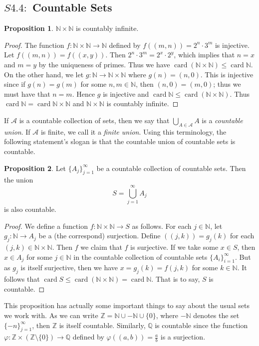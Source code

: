 \documentclass[9pt,reqno]{amsart}
\theoremstyle{definition}
\newtheorem{prop}{Proposition}[section]
\newcommand{\nn}{\mathbb N}
\newcommand{\zz}{\mathbb Z}
\newcommand{\qq}{\mathbb Q}
\DeclareMathOperator{\card}{card}
\begin{document}
\subsection{$S4.4:$ Countable Sets}
\begin{prop}
$\nn \times \nn$ is countably infinite.	
\end{prop}
\begin{proof}
	The function $f \colon \nn \times \nn \to \nn$ defined by $f((m,n))=2^n \cdot 3^m$ is injective. Let $f((m,n)) = f((x,y))$. Then $2^n \cdot 3^m = 2^x \cdot 2^y$, which implies that $n=x$ and $m=y$ by the uniqueness of primes. Thus we have $\card (\nn \times \nn) \leq \card \nn$. On the other hand, we let $g \colon \nn \to \nn \times \nn $ where $g (n) = (n,0)$. This is injective since if $g(n)=g(m)$ for some $n, m \in \nn$, then $(n,0) = (m, 0)$; thus we must have that $n=m$. Hence $g$ is injective and $\card \nn \leq \card (\nn \times \nn)$. Thus $\card \nn = \card \nn \times \nn$ and $\nn \times \nn$ is countably infinite. 
\end{proof}
If $\mathcal A$ is a countable collection of sets, then we say that $\bigcup _{A \in \mathcal A} A$ is a \textit{countable union}. If $\mathcal A$ is finite, we call it a \textit{finite union}. Using this terminology, the following statement's slogan is that the countable union of countable sets is countable.
\begin{prop}
Let $\{A_j\}_{j=1}^\infty$ be a countable collection of countable sets. Then the union $$S = \bigcup_{j=1}^\infty A_j$$ is also countable. 	
\end{prop}
\begin{proof}
	We define a function $f \colon \nn \times \nn \to S$ as follows. For each $j \in \nn$, let $g_j \colon \nn \to A_j$ be a (the correspond) surjection. Define $((j,k)) = g_j(k)$ for each $(j,k) \in \nn \times \nn$. Then $f$ we claim that $f$ is surjective. If we take some $x \in S$, then $x \in A_j$ for some $j \in \nn$ in the countable collection of countable sets $\{A_i\}_{i=1}^\infty$. But as $g_j$ is itself surjective, then we have $x=g_j(k)=f(j,k)$ for some $k \in \nn$. It follows that $\card S \leq \card (\nn \times \nn ) = \card \nn$. That is to say, $S$ is countable. 
\end{proof}
This proposition has actually some important things to say about the usual sets we work with. As we can write $\zz = \nn \cup -\nn \cup \{0 \}$, where $-\nn$ denotes the set $\{-n \}_{j=1}^\infty$, then $\zz$ is itself countable. Similarly, $\qq$ is countable since the function $\varphi \colon \zz \times (\zz\setminus \{0\}) \to \qq$ defined by $\varphi ((a,b)) = \frac{a}{b}$ is a surjection. 
\end{document}
